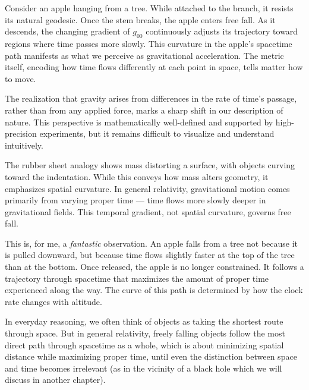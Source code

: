 Consider an apple hanging from a tree. While attached to the branch, it resists its natural geodesic. Once the stem breaks, the apple enters free fall. As it descends, the changing gradient of \( g_{00} \) continuously adjusts its trajectory toward regions where time passes more slowly. This curvature in the apple's spacetime path manifests as what we perceive as gravitational acceleration. The metric itself, encoding how time flows differently at each point in space, tells matter how to move.
\newpage

\begin{commentary}

The realization that gravity arises from differences in the rate of time’s passage, rather than from any applied force, marks a sharp shift in our description of nature. This perspective is mathematically well-defined and supported by high-precision experiments, but it remains difficult to visualize and understand intuitively.

The rubber sheet analogy shows mass distorting a surface, with objects curving toward the indentation. While this conveys how mass alters geometry, it emphasizes spatial curvature. In general relativity, gravitational motion comes primarily from varying proper time — time flows more slowly deeper in gravitational fields. This temporal gradient, not spatial curvature, governs free fall.

This is, for me, a \textit{fantastic} observation. An apple falls from a tree not because it is pulled downward, but because time flows slightly faster at the top of the tree than at the bottom. Once released, the apple is no longer constrained. It follows a trajectory through spacetime that maximizes the amount of proper time experienced along the way. The curve of this path is determined by how the clock rate changes with altitude.

In everyday reasoning, we often think of objects as taking the shortest route through space. But in general relativity, freely falling objects follow the most direct path through spacetime as a whole, which is about minimizing spatial distance while maximizing proper time, until even the distinction between space and time becomes irrelevant (as in the vicinity of a black hole which we will discuss in another chapter).

\end{commentary}